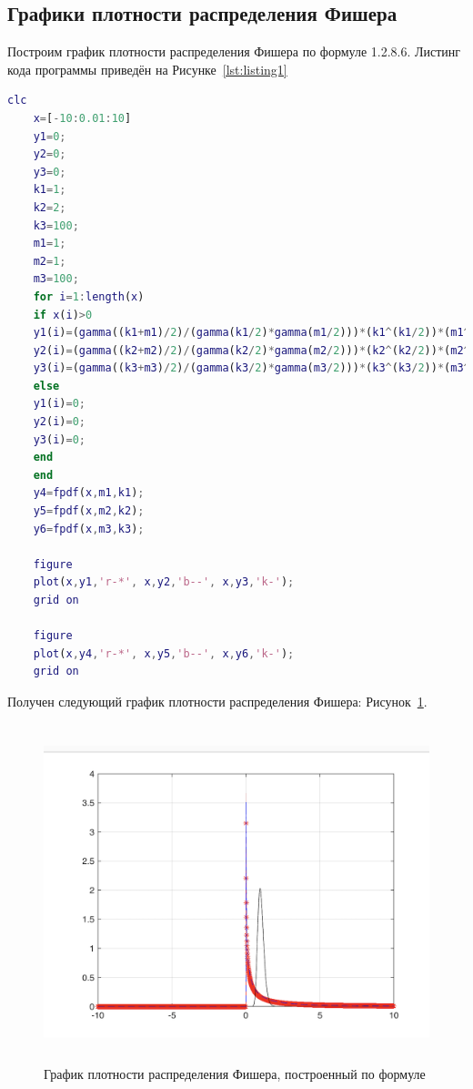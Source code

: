 \documentclass[a4paper,hidelinks,14pt]{extarticle}
\begin{document}
\subsection{Графики плотности распределения Фишера}
Построим график плотности распределения Фишера по формуле 1.2.8.6. Листинг кода программы приведён на Рисунке~\ref{lst:listing1}
\begin{lstlisting}[language=matlab,caption=Код программы \textit{Matlab}, label={lst:listing1}]
    clc
    x=[-10:0.01:10]
    y1=0;
    y2=0;
    y3=0;
    k1=1;
    k2=2;
    k3=100;
    m1=1;
    m2=1;
    m3=100;
    for i=1:length(x)
    if x(i)>0
    y1(i)=(gamma((k1+m1)/2)/(gamma(k1/2)*gamma(m1/2)))*(k1^(k1/2))*(m1^(m1/2))*(x(i)^((m1/2)-1))/((k1+m1*x(i))^((k1+m1)/2));
    y2(i)=(gamma((k2+m2)/2)/(gamma(k2/2)*gamma(m2/2)))*(k2^(k2/2))*(m2^(m2/2))*(x(i)^((m2/2)-1))/((k2+m2*x(i))^((k2+m2)/2));
    y3(i)=(gamma((k3+m3)/2)/(gamma(k3/2)*gamma(m3/2)))*(k3^(k3/2))*(m3^(m3/2))*(x(i)^((m3/2)-1))/((k3+m3*x(i))^((k3+m3)/2));
    else
    y1(i)=0;
    y2(i)=0;
    y3(i)=0;
    end
    end
    y4=fpdf(x,m1,k1);
    y5=fpdf(x,m2,k2);
    y6=fpdf(x,m3,k3);

    figure
    plot(x,y1,'r-*', x,y2,'b--', x,y3,'k-');
    grid on

    figure
    plot(x,y4,'r-*', x,y5,'b--', x,y6,'k-');
    grid on

\end{lstlisting}

Получен следующий график плотности распределения Фишера: Рисунок~\ref{fig:fig3}.

\begin{figure}[htbp]
    \centering
    \includegraphics[width=150mm,height=98mm,scale=0.7]{fig/raspr2.png}
    \caption{График плотности распределения Фишера, построенный по формуле}
    \label{fig:fig3}
\end{figure}
\end{document}
